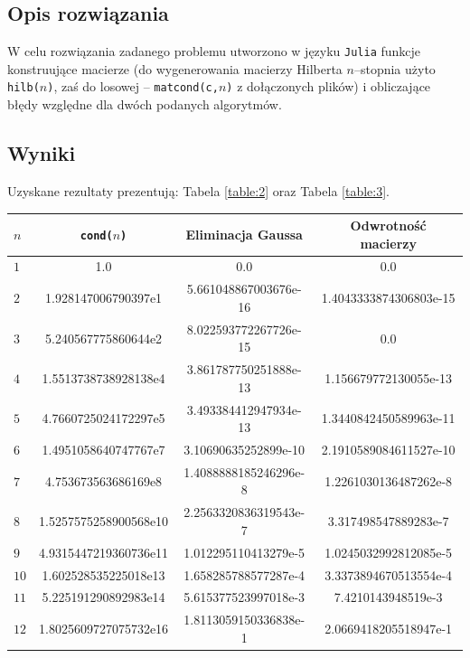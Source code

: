 \documentclass{classrep}
\begin{document}
	\subsection{Opis rozwiązania}
		W celu rozwiązania zadanego problemu utworzono w języku \texttt{Julia} funkcje konstruujące macierze (do wygenerowania macierzy Hilberta $n$--stopnia użyto \texttt{hilb($n$)}, zaś do losowej -- \texttt{matcond(c,$n$)} z dołączonych plików) i obliczające błędy względne dla dwóch podanych algorytmów.
	\subsection{Wyniki}
		Uzyskane rezultaty prezentują: Tabela \ref{table:2} oraz Tabela \ref{table:3}.
		\begin{table}[!h]
        	\centering
        	\footnotesize
			\begin{tabular}{l|S|S|S} \toprule
				{$n$} & {\texttt{cond($n$)}} & {Eliminacja Gaussa} & {Odwrotność macierzy} \\ \midrule
				$1$ & 1.0 & 0.0 & 0.0 \\ 
	 			$2$ & 1.928147006790397e1 & 5.661048867003676e-16 & 1.4043333874306803e-15 \\
	 			$3$ & 5.240567775860644e2 & 8.022593772267726e-15 & 0.0 \\
	 			$4$ & 1.5513738738928138e4 & 3.861787750251888e-13 & 1.156679772130055e-13 \\
	 			$5$ & 4.7660725024172297e5 & 3.493384412947934e-13 & 1.3440842450589963e-11 \\ 
	 			$6$ & 1.4951058640747767e7 & 3.10690635252899e-10 & 2.1910589084611527e-10 \\
	 			$7$ & 4.753673563686169e8 & 1.4088888185246296e-8 & 1.2261030136487262e-8 \\
	 			$8$ & 1.5257575258900568e10 & 2.2563320836319543e-7 & 3.317498547889283e-7 \\ 
	 			$9$ & 4.9315447219360736e11 & 1.012295110413279e-5 & 1.0245032992812085e-5 \\
	 			$10$ & 1.602528535225018e13 & 1.658285788577287e-4 & 3.3373894670513554e-4 \\
	 			$11$ & 5.225191290892983e14 & 5.615377523997018e-3 & 7.4210143948519e-3 \\ 
	 			$12$ & 1.8025609727075732e16 & 1.8113059150336838e-1 & 2.0669418205518947e-1 \\

\end{tabular}
\end{table}
\end{document}
